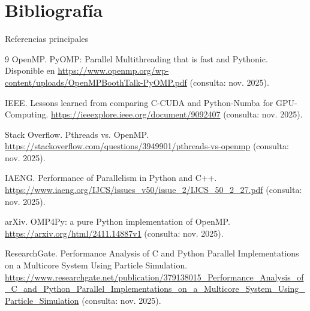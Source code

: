 \section{Bibliografía}

\begin{frame}[allowframebreaks]{Referencias principales}
  \begin{thebibliography}{9}
    OpenMP. PyOMP: Parallel Multithreading that is fast and Pythonic. Disponible en \url{https://www.openmp.org/wp-content/uploads/OpenMPBoothTalk-PyOMP.pdf} (consulta: nov. 2025).

    IEEE. Lessons learned from comparing C-CUDA and Python-Numba for GPU-Computing. \url{https://ieeexplore.ieee.org/document/9092407} (consulta: nov. 2025).

    Stack Overflow. Pthreads vs. OpenMP. \url{https://stackoverflow.com/questions/3949901/pthreads-vs-openmp} (consulta: nov. 2025).

    IAENG. Performance of Parallelism in Python and C++. \url{https://www.iaeng.org/IJCS/issues_v50/issue_2/IJCS_50_2_27.pdf} (consulta: nov. 2025).

    arXiv. OMP4Py: a pure Python implementation of OpenMP. \url{https://arxiv.org/html/2411.14887v1} (consulta: nov. 2025).

    ResearchGate. Performance Analysis of C and Python Parallel Implementations on a Multicore System Using Particle Simulation. \url{https://www.researchgate.net/publication/379138015_Performance_Analysis_of_C_and_Python_Parallel_Implementations_on_a_Multicore_System_Using_Particle_Simulation} (consulta: nov. 2025).
  \end{thebibliography}
\end{frame}
